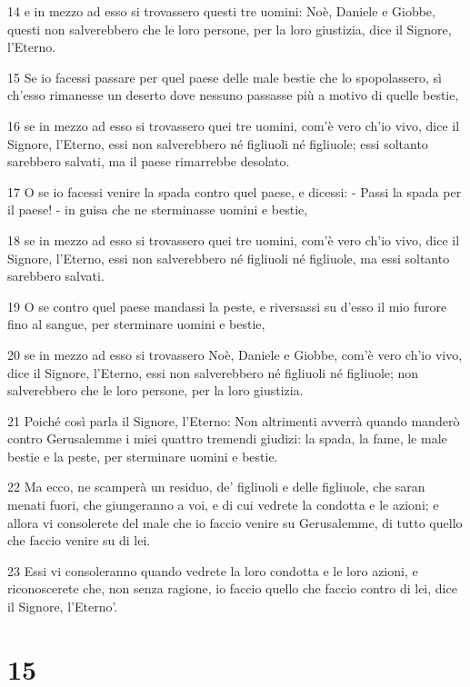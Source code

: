 \par 14 e in mezzo ad esso si trovassero questi tre uomini: Noè, Daniele e Giobbe, questi non salverebbero che le loro persone, per la loro giustizia, dice il Signore, l'Eterno.
\par 15 Se io facessi passare per quel paese delle male bestie che lo spopolassero, sì ch'esso rimanesse un deserto dove nessuno passasse più a motivo di quelle bestie,
\par 16 se in mezzo ad esso si trovassero quei tre uomini, com'è vero ch'io vivo, dice il Signore, l'Eterno, essi non salverebbero né figliuoli né figliuole; essi soltanto sarebbero salvati, ma il paese rimarrebbe desolato.
\par 17 O se io facessi venire la spada contro quel paese, e dicessi: - Passi la spada per il paese! - in guisa che ne sterminasse uomini e bestie,
\par 18 se in mezzo ad esso si trovassero quei tre uomini, com'è vero ch'io vivo, dice il Signore, l'Eterno, essi non salverebbero né figliuoli né figliuole, ma essi soltanto sarebbero salvati.
\par 19 O se contro quel paese mandassi la peste, e riversassi su d'esso il mio furore fino al sangue, per sterminare uomini e bestie,
\par 20 se in mezzo ad esso si trovassero Noè, Daniele e Giobbe, com'è vero ch'io vivo, dice il Signore, l'Eterno, essi non salverebbero né figliuoli né figliuole; non salverebbero che le loro persone, per la loro giustizia.
\par 21 Poiché così parla il Signore, l'Eterno: Non altrimenti avverrà quando manderò contro Gerusalemme i miei quattro tremendi giudizi: la spada, la fame, le male bestie e la peste, per sterminare uomini e bestie.
\par 22 Ma ecco, ne scamperà un residuo, de' figliuoli e delle figliuole, che saran menati fuori, che giungeranno a voi, e di cui vedrete la condotta e le azioni; e allora vi consolerete del male che io faccio venire su Gerusalemme, di tutto quello che faccio venire su di lei.
\par 23 Essi vi consoleranno quando vedrete la loro condotta e le loro azioni, e riconoscerete che, non senza ragione, io faccio quello che faccio contro di lei, dice il Signore, l'Eterno'.

\chapter{15}


